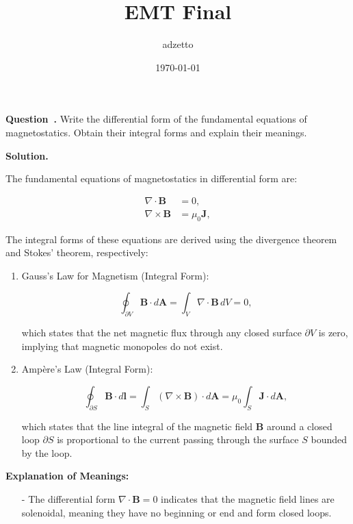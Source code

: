 \documentclass[12pt, a4paper, oneside]{report}
\title{EMT Final}
\author{adzetto}
\date{\today}
\newcounter{question}
\newenvironment{question}[1][]{\refstepcounter{question}\par\medskip
   \begin{mdframed}[backgroundcolor=gray!20]
   \noindent \textbf{Question~\thequestion. #1} \rmfamily}{\end{mdframed}\medskip}
\newenvironment{solution}{
  \par\medskip\noindent
  \textbf{Solution.}\quad\itshape
  \par\noindent\makebox[\linewidth]{\rule{\textwidth}{0.4pt}}
}{
  \par\noindent\makebox[\linewidth]{\rule{\textwidth}{0.4pt}}
  \par\medskip
}
\begin{document}
\maketitle




\begin{question}
Write the differential form of the fundamental equations of magnetostatics. Obtain their integral forms and explain their meanings.
\end{question}

\begin{solution}

The fundamental equations of magnetostatics in differential form are:

\[
\begin{aligned}
    \nabla \cdot \mathbf{B} &= 0, \\
    \nabla \times \mathbf{B} &= \mu_0 \mathbf{J},
\end{aligned}
\]

The integral forms of these equations are derived using the divergence theorem and Stokes' theorem, respectively:

\begin{enumerate}



\item Gauss's Law for Magnetism (Integral Form):

\[
\oint_{\partial V} \mathbf{B} \cdot d\mathbf{A} = \int_V \nabla \cdot \mathbf{B} \, dV = 0,
\]

which states that the net magnetic flux through any closed surface \(\partial V\) is zero, implying that magnetic monopoles do not exist.

\item Ampère's Law (Integral Form):

\[
\oint_{\partial S} \mathbf{B} \cdot d\mathbf{l} = \int_S (\nabla \times \mathbf{B}) \cdot d\mathbf{A} = \mu_0 \int_S \mathbf{J} \cdot d\mathbf{A},
\]

which states that the line integral of the magnetic field \(\mathbf{B}\) around a closed loop \(\partial S\) is proportional to the current passing through the surface \(S\) bounded by the loop.

\end{enumerate}

\textbf{Explanation of Meanings:}

\begin{itemize}

\item[-] The differential form \(\nabla \cdot \mathbf{B} = 0\) indicates that the magnetic field lines are solenoidal, meaning they have no beginning or end and form closed loops.


\end{itemize}
\end{solution}
\end{document}
